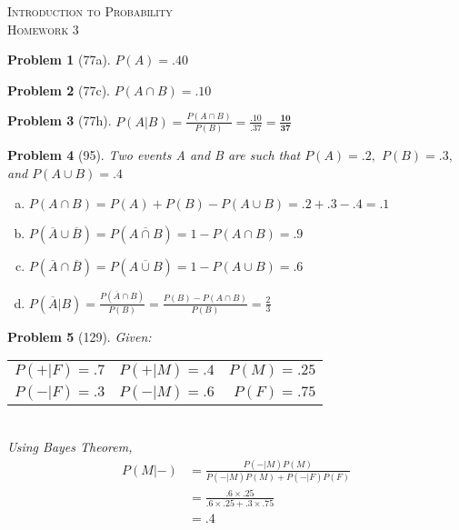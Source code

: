 \documentclass{article}
\theoremstyle{problem}
\newtheorem{prob}{Problem}
\begin{document}
\begin{center}
  \textsc{\Large Introduction to Probability}\\[.3cm]
  \textsc{\Large Homework 3}
\end{center}

\begin{prob}[77a]
$P(A) = \mathbf{.40}$
\end{prob}
\begin{prob}[77c]
$P(A \cap B) = \mathbf{.10}$
\end{prob}
\begin{prob}[77h]
$P(A|B) = \frac{P(A \cap B)}{P(B)} = \frac{.10}{.37} = \mathbf{\frac{10}{37}}$
\end{prob}


\begin{prob}[95]
Two events A and B are such that $P(A) = .2,$ $P(B) = .3,$ and $P(A \cup B) = .4$
\begin{enumerate}[a)]
\item $P(A \cap B) = P(A) + P(B) - P(A \cup B) = .2 + .3 - .4 = \mathbf{.1}$
\item $P(\overline{A} \cup \overline{B}) = P(\overline{A \cap B}) = 1 - P(A \cap B) = \mathbf{.9}$
\item $P(\overline{A} \cap \overline{B}) = P(\overline{A \cup B}) = 1 - P(A \cup B) = \mathbf{.6}$
\item $P(\overline{A}|B) = \frac{P(\overline{A} \cap B)}{P(B)} = \frac{P(B) - P(A \cap B)}{P(B)} = \frac{2}{3}$
\end{enumerate}
\end{prob}

\begin{prob}[129]
Given:
\begin{tabular}{l c r}
$P(+|F) = .7$ & $P(+|M) = .4$ & $P(M) = .25$\\
$P(-|F) = .3$ & $P(-|M) = .6$ & $P(F) = .75$
\end{tabular}\\

\noindent
Using Bayes Theorem,
\begin{align*}
P(M|-) &= \frac{P(-|M)P(M)}{P(-|M)P(M) + P(-|F)P(F)}\\
       &= \frac{.6 \times .25}{.6 \times .25 + .3 \times .75}\\
       &= .4
\end{align*}
\end{prob}
\end{document}
